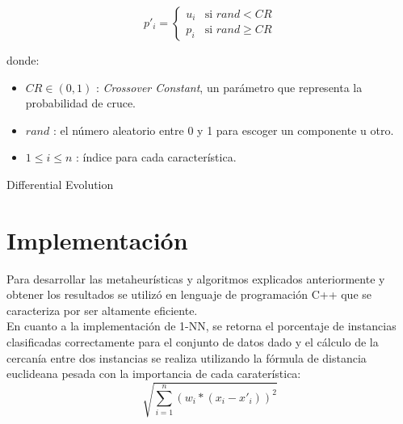 \documentclass{ci5652}
\begin{document}
\[
p'_i = 
  \begin{cases}
    u_i & \text{si } rand < CR\\
    p_i & \text{si } rand \geq CR 
  \end{cases} 
\]

donde: 
\begin{itemize}
  \item $CR \in (0,1)$ : \textit{Crossover Constant}, un parámetro que
  representa la probabilidad de cruce.
  \item $rand$ : el número aleatorio entre 0 y 1 para escoger un componente u 
  otro.
  \item $1 \leq i \leq n $ : índice para cada característica.
\end{itemize}

\begin{algorithm}
 \DontPrintSemicolon
 \vspace*{0.1cm}
 \vspace*{0.1cm}
 \caption{Differential Evolution}
\end{algorithm}


\section{Implementación}

Para desarrollar las metaheurísticas y algoritmos explicados anteriormente y 
obtener los resultados se utilizó en lenguaje de programación C++ que se 
caracteriza por ser altamente eficiente.\\

En cuanto a la implementación de 1-NN, se retorna el porcentaje de instancias
clasificadas correctamente para el conjunto de datos dado y el cálculo de la 
cercanía entre dos instancias se realiza utilizando la fórmula de distancia 
euclideana pesada con la importancia de cada caraterística: 
$$\sqrt{\sum_{i=1}^n (w_i * (x_i - x'_i))^{2}}$$
\end{document}
